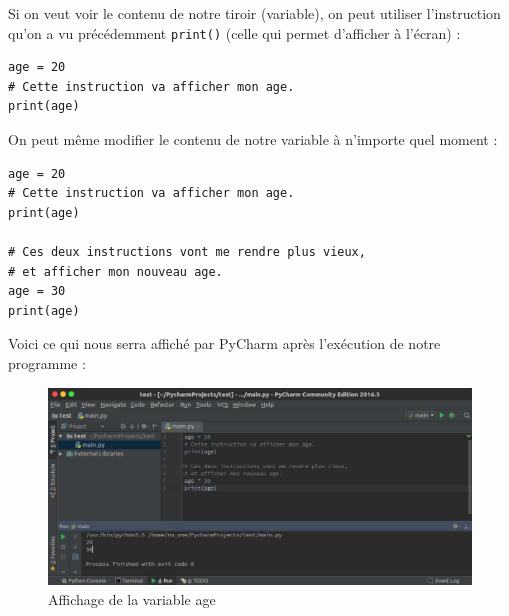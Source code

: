\documentclass[12pt]{article}
\newcommand{\code}[1]{\colorbox{light-gray}{\texttt{#1}}}
\begin{document}
            Si on veut voir le contenu de notre tiroir (variable), on peut utiliser 
            l'instruction qu'on a vu précédemment \code{print()} (celle qui permet d'afficher à l'écran) :
            \begin{lstlisting}[style=code]
age = 20
# Cette instruction va afficher mon age.
print(age) 
            \end{lstlisting}

            On peut même modifier le contenu de notre variable à n'importe quel moment :
            \begin{lstlisting}[style=code]
age = 20
# Cette instruction va afficher mon age.
print(age) 

# Ces deux instructions vont me rendre plus vieux, 
# et afficher mon nouveau age.
age = 30
print(age)
            \end{lstlisting}

            Voici ce qui nous serra affiché par PyCharm après l'exécution de notre programme :

            \begin{figure}[H]
                \centering
                \includegraphics[width=\linewidth]{img/15_affiche_variables.png}
                \caption{Affichage de la variable age}
            \end{figure}
\end{document}
